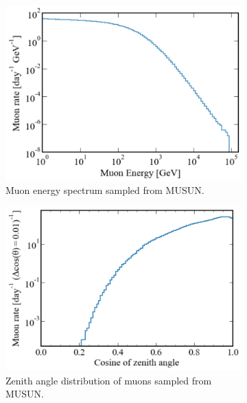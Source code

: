 \begin{figure}[htbp]
    \centering
    \begin{subfigure}[b]{0.48\textwidth}
        \centering
        \includegraphics[width=\textwidth]{figures/Muons/Primary_energyLZstyle.pdf}
        \caption{Muon energy spectrum sampled from MUSUN.}
        \label{fig:Prim_E}
    \end{subfigure}
    \begin{subfigure}[b]{0.49\textwidth}  
        \centering 
        \includegraphics[width=\textwidth]{figures/Muons/cosZ_LZstyle.pdf}
        \caption{Zenith angle distribution of muons sampled from MUSUN.}
        \label{fig:cosZ}
    \end{subfigure}
    \begin{subfigure}[b]{0.49\textwidth}   

\end{subfigure}
\end{figure}
